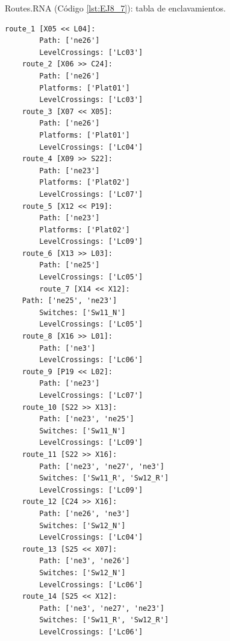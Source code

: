 	Routes.RNA (Código \ref{lst:EJ8_7}): tabla de enclavamientos.
	
	\begin{lstlisting}[language = {}, caption = Routes.RNA, label = {lst:EJ8_7}]
	route_1 [X05 << L04]:
		Path: ['ne26']
		LevelCrossings: ['Lc03']
	route_2 [X06 >> C24]:
		Path: ['ne26']
		Platforms: ['Plat01']
		LevelCrossings: ['Lc03']
	route_3 [X07 << X05]:
		Path: ['ne26']
		Platforms: ['Plat01']
		LevelCrossings: ['Lc04']
	route_4 [X09 >> S22]:
		Path: ['ne23']
		Platforms: ['Plat02']
		LevelCrossings: ['Lc07']
	route_5 [X12 << P19]:
		Path: ['ne23']
		Platforms: ['Plat02']
		LevelCrossings: ['Lc09']
	route_6 [X13 >> L03]:
		Path: ['ne25']
		LevelCrossings: ['Lc05']
		route_7 [X14 << X12]:
	Path: ['ne25', 'ne23']
		Switches: ['Sw11_N']
		LevelCrossings: ['Lc05']
	route_8 [X16 >> L01]:
		Path: ['ne3']
		LevelCrossings: ['Lc06']
	route_9 [P19 << L02]:
		Path: ['ne23']
		LevelCrossings: ['Lc07']
	route_10 [S22 >> X13]:
		Path: ['ne23', 'ne25']
		Switches: ['Sw11_N']
		LevelCrossings: ['Lc09']
	route_11 [S22 >> X16]:
		Path: ['ne23', 'ne27', 'ne3']
		Switches: ['Sw11_R', 'Sw12_R']
		LevelCrossings: ['Lc09']
	route_12 [C24 >> X16]:
		Path: ['ne26', 'ne3']
		Switches: ['Sw12_N']
		LevelCrossings: ['Lc04']
	route_13 [S25 << X07]:
		Path: ['ne3', 'ne26']
		Switches: ['Sw12_N']
		LevelCrossings: ['Lc06']
	route_14 [S25 << X12]:
		Path: ['ne3', 'ne27', 'ne23']
		Switches: ['Sw11_R', 'Sw12_R']
		LevelCrossings: ['Lc06']
	\end{lstlisting}